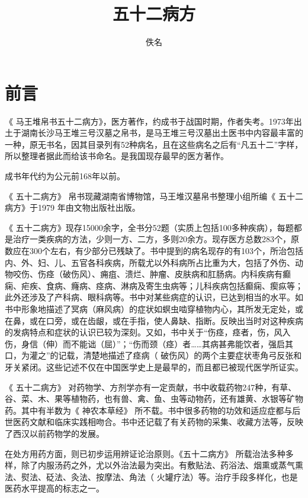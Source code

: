 \documentclass{ctexbook}
\title{五十二病方}
\author{佚名}
\date{}
\begin{document}
	
	\maketitle
	\tableofcontents
	
	\chapter{前言}
	
	《 马王堆帛书五十二病方》，医方著作，约成书于战国时期，作者失考。1973年出土于湖南长沙马王堆三号汉墓之帛书，是马王堆三号汉墓出土医书中内容最丰富的一种，原无书名，因其目录列有52种病名，且在这些病名之后有“凡五十二”字样，所以整理者据此而给该书命名。是我国现存最早的医方著作。
	
	成书年代约为公元前168年以前。
	 
	《 五十二病方》 帛书现藏湖南省博物馆，马王堆汉墓帛书整理小组所编《 五十二病方》于1979 年由文物出版社出版。
	
	《 五十二病方》现存15000余字，全书分52题（实质上包括100多种疾病），每题都是治疗一类疾病的方法，少则一方、二方，多则20余方。现存医方总数283个，原数应在300个左右，有少部分已残缺了。书中提到的病名现存的有103个，所治包括内、外、妇、儿、五官各科疾病，所载尤以外科病所占比重为大，包括了外伤、动物咬伤、伤痉（破伤风）、痈疽、溃烂、肿瘤、皮肤病和肛肠病。内科疾病有癫痫、疟疾、食病、癃病、痉病、淋病及寄生虫病等；儿科疾病包括癫痫、瘈疭等；此外还涉及了产科病、眼科病等。书中对某些病症的认识，已达到相当的水平。如书中形象地描述了冥病（麻风病）的症状如螟虫啮穿植物内心，其所发无定处，或在鼻，或在口旁，或在齿龈，或在手指，使人鼻缺、指断。反映出当时对这种疾病的发病特点和症状的认识已较为深刻。又如，书中关于“伤痉，痉者，伤，风入伤，身信（伸）而不能诎（屈）”；“伤而颈（痉）者……其病甚弗能饮者，强启其口，为灌之”的记载，清楚地描述了痉病（ 破伤风）的两个主要症状枣角弓反张和牙关紧闭。这些记述不仅在中国医学史上是最早的，而且都已被现代医学所证实。 
	
	《 五十二病方》 对药物学、方剂学亦有一定贡献，书中收载药物247种，有草、谷、菜、木、果等植物药，也有兽、禽、鱼、虫等动物药，还有雄黄、水银等矿物药。其中有半数为《 神农本草经》 所不载。书中很多药物的功效和适应症都与后世医药文献和临床实践相吻合。书中还记载了有关药物的采集、收藏方法等，反映了西汉以前药物学的发展。
	
	在处方用药方面，则已初步运用辨证论治原则。《五十二病方》 所载治法多种多样，除了内服汤药之外，尤以外治法最为突出。有敷贴法、药浴法、烟熏或蒸气熏法、熨法、砭法、灸法、按摩法、角法（ 火罐疗法）等。治疗手段多样化，也是医药水平提高的标志之一。
	
\end{document}
